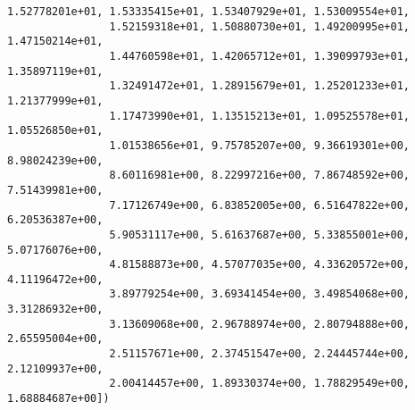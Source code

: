 \documentclass[11pt]{article}
\begin{document}
\begin{Verbatim}[commandchars=\\\{\}]
                1.52778201e+01, 1.53335415e+01, 1.53407929e+01, 1.53009554e+01,
                1.52159318e+01, 1.50880730e+01, 1.49200995e+01, 1.47150214e+01,
                1.44760598e+01, 1.42065712e+01, 1.39099793e+01, 1.35897119e+01,
                1.32491472e+01, 1.28915679e+01, 1.25201233e+01, 1.21377999e+01,
                1.17473990e+01, 1.13515213e+01, 1.09525578e+01, 1.05526850e+01,
                1.01538656e+01, 9.75785207e+00, 9.36619301e+00, 8.98024239e+00,
                8.60116981e+00, 8.22997216e+00, 7.86748592e+00, 7.51439981e+00,
                7.17126749e+00, 6.83852005e+00, 6.51647822e+00, 6.20536387e+00,
                5.90531117e+00, 5.61637687e+00, 5.33855001e+00, 5.07176076e+00,
                4.81588873e+00, 4.57077035e+00, 4.33620572e+00, 4.11196472e+00,
                3.89779254e+00, 3.69341454e+00, 3.49854068e+00, 3.31286932e+00,
                3.13609068e+00, 2.96788974e+00, 2.80794888e+00, 2.65595004e+00,
                2.51157671e+00, 2.37451547e+00, 2.24445744e+00, 2.12109937e+00,
                2.00414457e+00, 1.89330374e+00, 1.78829549e+00, 1.68884687e+00])
\end{Verbatim}
            

    
    
    
    
\end{document}
